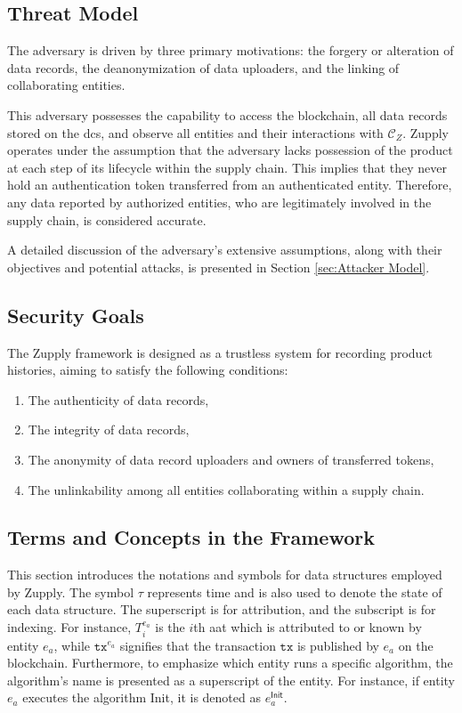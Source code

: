 \subsection{Threat Model}

The adversary is driven by three primary motivations: the forgery or alteration of data records, the deanonymization of data uploaders, and the linking of collaborating entities. 

This adversary possesses the capability to access the blockchain, all data records stored on the \gls{dcs}, and observe all entities and their interactions with $\mathcal{C}_Z$. Zupply operates under the assumption that the adversary lacks possession of the product at each step of its lifecycle within the supply chain. This implies that they never hold an authentication token transferred from an authenticated entity. Therefore, any data reported by authorized entities, who are legitimately involved in the supply chain, is considered accurate. 

A detailed discussion of the adversary's extensive assumptions, along with their objectives and potential attacks, is presented in Section \ref{sec:Attacker Model}.

\subsection{Security Goals}

The Zupply framework is designed as a trustless system for recording product histories, aiming to satisfy the following conditions:

\begin{enumerate}
\item The authenticity of data records, 
\item The integrity of data records,
\item The anonymity of data record uploaders and owners of transferred tokens,
\item The unlinkability among all entities collaborating within a supply chain.
\end{enumerate}


\subsection{Terms and Concepts in the Framework}
\label{sec:zupply-terms-and-concepts}
This section introduces the notations and symbols for data structures employed by Zupply. The symbol $\tau$ represents time and is also used to denote the state of each data structure. The superscript is for attribution, and the subscript is for indexing. For instance, \(T_i^{e_a}\) is the $i$th \gls{aat} which is attributed to or known by entity \(e_a\), while \(\texttt{tx}^{e_a}\) signifies that the transaction \(\texttt{tx}\) is published by \(e_a\) on the blockchain. Furthermore, to emphasize which entity runs a specific algorithm, the algorithm's name is presented as a superscript of the entity. For instance, if entity $e_a$ executes the algorithm \textsf{Init}, it is denoted as $e_a^\mathsf{Init}$.


